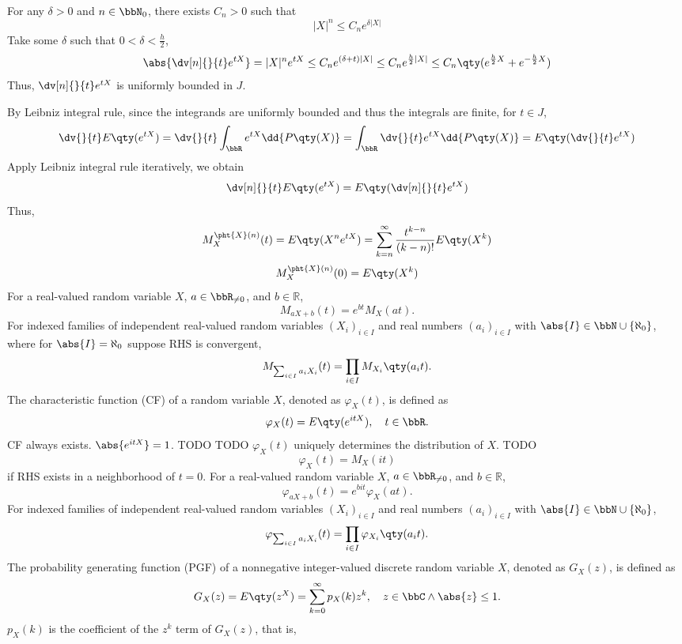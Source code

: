 \documentclass[a4paper,12pt]{report}
\begin{document}
For any $\delta>0$ and $n\in\bbN_0$, there exists $C_n>0$ such that
\[|X|^n\le C_ne^{\delta|X|}\]
Take some $\delta$ such that $0<\delta<\frac{h}{2}$,
\[\abs{\dv[n]{}{t}e^{tX}}=|X|^ne^{tX}\le C_ne^{(\delta+t)|X|}\le C_ne^{\frac{h}{2}|X|}\le C_n\qty(e^{\frac{h}{2}X}+e^{-\frac{h}{2}X})\]
Thus, $\dv[n]{}{t}e^{tX}$ is uniformly bounded in $J$.

By Leibniz integral rule, since the integrands are uniformly bounded and thus the integrals are finite, for $t\in J$,
\[\dv{}{t}E\qty(e^{tX})=\dv{}{t}\int_{\bbR}e^{tX}\dd{P\qty(X)}=\int_{\bbR}\dv{}{t}e^{tX}\dd{P\qty(X)}=E\qty(\dv{}{t}e^{tX})\]
Apply Leibniz integral rule iteratively, we obtain
\[\dv[n]{}{t}E\qty(e^{tX})=E\qty(\dv[n]{}{t}e^{tX})\]
Thus,
\[M_X^{\pht{X}(n)}(t)=E\qty(X^ne^{tX})=\sum_{k=n}^{\infty}\frac{t^{k-n}}{(k-n)!}E\qty(X^k)\]
\[M_X^{\pht{X}(n)}(0)=E\qty(X^k)\]
\epr
{}
For a real-valued random variable $X$, $a\in\bbR_{\neq0}$, and $b\in\mathbb{R}$,
\[M_{aX+b}(t)=e^{bt}M_X(at).\]
For indexed families of independent real-valued random variables $(X_i)_{i\in I}$ and real numbers $(a_i)_{i\in I}$ with $\abs{I}\in\bbN\cup\{\aleph_0\}$, where for $\abs{I}=\aleph_0$ suppose RHS is convergent,
\[M_{\sum_{i\in I}a_iX_i}(t)=\prod_{i\in I}M_{X_i}\qty(a_it).\]
The characteristic function (CF) of a random variable $X$, denoted as $\varphi_X(t)$, is defined as
\[\varphi_X(t)=E\qty(e^{itX}),\quad t\in\bbR.\]
CF always exists.
\bpr
$\abs{e^{itX}}=1$.
TODO
\epr
{}
TODO
$\varphi_X(t)$ uniquely determines the distribution of $X$.
\bpr
TODO
\epr
{}
\[\varphi_X(t)=M_X(it)\]
if RHS exists in a neighborhood of $t=0$.
For a real-valued random variable $X$, $a\in\bbR_{\neq0}$, and $b\in\mathbb{R}$,
\[\varphi_{aX+b}(t)=e^{bit}\varphi_X(at).\]
For indexed families of independent real-valued random variables $(X_i)_{i\in I}$ and real numbers $(a_i)_{i\in I}$ with $\abs{I}\in\bbN\cup\{\aleph_0\}$,
\[\varphi_{\sum_{i\in I}a_iX_i}(t)=\prod_{i\in I}\varphi_{X_i}\qty(a_it).\]
The probability generating function (PGF) of a nonnegative integer-valued discrete random variable $X$, denoted as $G_X(z)$, is defined as
\[G_X(z)=E\qty(z^X)=\sum_{k=0}^{\infty}p_X(k)z^k,\quad z\in\bbC\land \abs{z}\le1.\]
$p_X(k)$ is the coefficient of the $z^k$ term of $G_X(z)$, that is,
\end{document}
